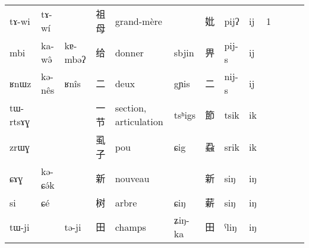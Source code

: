 \documentclass[oldfontcommands,oneside,a4paper,11pt]{article}
\newcommand{\ipa}[1]{{\phon #1}} %
\newcommand{\zh}[1]{{\cn #1}}
\begin{document}
\begin{landscape}
\begin{table}[h]
{\begin{tabular}{lllllllllllll}
\ipa{tɤ-wi}  &	\ipa{tɤ-wí}  &	\ipa{}  &		\zh{祖母}  &	grand-mère  &	\ipa{}  &	\zh{妣}  &	\ipa{*pijʔ}  &	\ipa{ij}  &	1  \\
\ipa{mbi}  &	\ipa{ka-wə̂}  &	\ipa{kɐ-mbəʔ}  &		\zh{给}  &	donner  &	\ipa{sbjin}  &	\zh{畀}  &	\ipa{*pij-s}  &	\ipa{ij}  &	  \\
\ipa{ʁnɯz}  &	\ipa{kə-nês}  &	\ipa{ʁnîs}  &		\zh{二}  &	deux  &	\ipa{gɲis}  &	\zh{二}  &	\ipa{*nij-s}  &	\ipa{ij}  &	  \\
\ipa{tɯ-rtsɤɣ}  &	\ipa{}  &	\ipa{}  &		\zh{一节}  &	section, articulation  &	\ipa{tsʰigs}  &	\zh{節}  &	\ipa{*tsik}  &	\ipa{ik}  &	  \\
\ipa{zrɯɣ}  &	\ipa{}  &	\ipa{}  &		\zh{虱子}  &	pou  &	\ipa{ɕig}  &	\zh{蝨}  &	\ipa{*srik}  &	\ipa{ik}  &	  \\
\ipa{ɕɤɣ}  &	\ipa{kə-ɕə́k}  &	\ipa{}  &		\zh{新}  &	nouveau  &	\ipa{}  &	\zh{新}  &	\ipa{*siŋ}  &	\ipa{iŋ}  &	  \\
\ipa{si}  &	\ipa{ɕé}  &	\ipa{}  &		\zh{树}  &	arbre  &	\ipa{ɕiŋ}  &	\zh{薪}  &	\ipa{*siŋ}  &	\ipa{iŋ}  &	  \\
\ipa{tɯ-ji}  &	\ipa{}  &	\ipa{tə-ji}  &		\zh{田}  &	champs  &	\ipa{ʑiŋ-ka}  &	\zh{田}  &	\ipa{*ˁliŋ}  &	\ipa{iŋ}  &	  \\
\end{tabular}}
\end{table}


\end{landscape}
\end{document}
